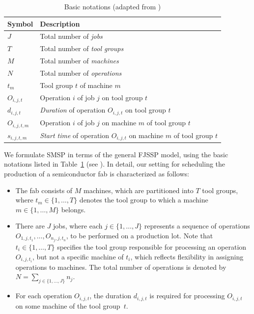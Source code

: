\documentclass[runningheads]{llncs}
\begin{document}
\begin{table}[t]
	\caption{Basic notations (adapted from \cite{Ali2024})}\label{notations} \centering
	\begin{tabular}{|l|l|}
		\hline
		Symbol & Description \\ \hline
		$J$ & Total number of \emph{jobs}        \\
		$T$ & Total number of \emph{tool groups} \\
		$M$ & Total number of \emph{machines}    \\
		$N$ & Total number of \emph{operations} \\
		$t_{m}$ & Tool group $t$ of machine $m$ \\
		$O_{i,j,t}$ & Operation $i$ of job $j$ on tool group $t$  \\
		$d_{i,j,t}$ & \emph{Duration} of operation $O_{i,j,t}$ on tool group $t$ \\
		$O_{i,j,t,m}$ & Operation $i$ of job $j$ on machine $m$ of tool group $t$  \\
		$s_{i,j,t,m}$ & \emph{Start time} of operation $O_{i,j,t}$ on machine $m$ of tool group $t$  \\
		\hline
	\end{tabular}
\end{table}

We formulate SMSP in terms of the general FJSSP model,
using the basic notations listed in Table~\ref{notations} (see \cite{Ali2024}). 
In detail, our setting for scheduling the production of a semiconductor fab is characterized as follows:

\begin{itemize}
	\item The fab consists of $M$ machines, which are partitioned into $T$
	tool groups, where $t_m\in\{1,\dots,T\}$ denotes the tool group
	to which a machine $m\in\{1,\dots,M\}$ belongs.
	\item There are $J$ jobs, where each $j\in\{1,\dots,J\}$ represents a
	sequence of operations $O_{1,j,t_1},\dots,O_{n_j,j,t_n}$, to be performed on a production lot.
	Note that $t_i\in\{1,\dots,T\}$ specifies the tool group 
	responsible for processing an operation $O_{i,j,t_i}$, %
	but not a specific machine of $t_i$,
	which reflects flexibility in assigning operations to machines.
	The total number of operations is denoted by
	$N = \sum_{j\in\{1,\dots,J\}}n_j$.
	\item For each operation $O_{i,j,t}$,
	the duration $d_{i,j,t}$ is required for processing $O_{i,j,t}$
	on some machine of the tool group~$t$.
\end{itemize}
\end{document}

